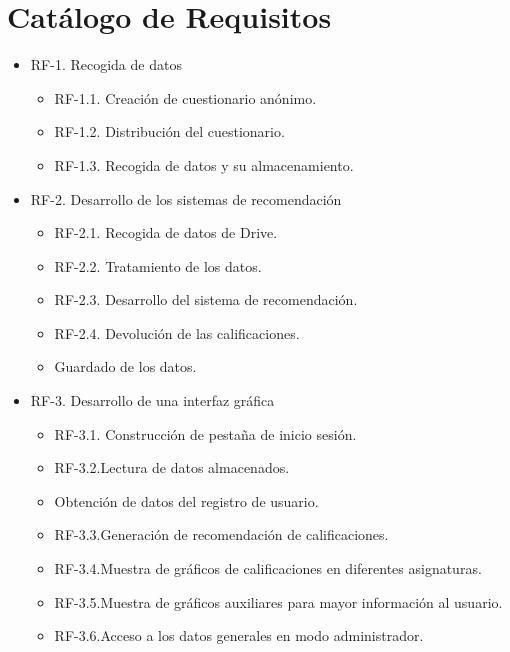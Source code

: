 \section{Catálogo de Requisitos}
\begin{itemize}
\item RF-1. Recogida de datos\\ 
\begin{itemize}
\item RF-1.1. Creación de cuestionario anónimo.\\ 
\item RF-1.2. Distribución del cuestionario. \\ 
\item RF-1.3. Recogida de datos y su almacenamiento. 
\end{itemize}

\item RF-2. Desarrollo de los sistemas de recomendación\\ 
\begin{itemize}
\item RF-2.1. Recogida de datos de Drive. 
\item RF-2.2. Tratamiento de los datos. 
\item RF-2.3. Desarrollo del sistema de recomendación. 
\item RF-2.4. Devolución de las calificaciones. \item Guardado de los datos. 
\end{itemize}

\item RF-3. Desarrollo de una interfaz gráfica \\ 
\begin{itemize}
\item RF-3.1. Construcción de pestaña de inicio sesión.  
\item RF-3.2.Lectura de datos almacenados. \item Obtención de datos del registro de usuario. 
\item RF-3.3.Generación de recomendación de calificaciones. 
\item RF-3.4.Muestra de gráficos de calificaciones en diferentes asignaturas. 
\item RF-3.5.Muestra de gráficos auxiliares para mayor información al usuario. 
\item RF-3.6.Acceso a los datos generales en modo administrador. 
\end{itemize}
\end{itemize}

